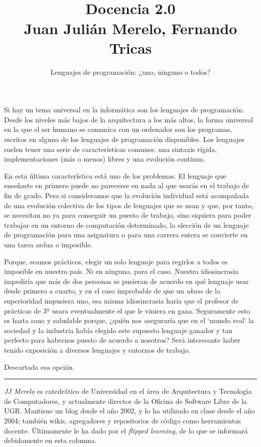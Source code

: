 \documentclass[twoside,10pt]{article}
\title{\ \\ Docencia 2.0\\ \large Juan Juli\'{a}n Merelo, Fernando Tricas}
\author{\LARGE Lenguajes de programación: ¿uno, ninguno o todos?}
\date{}
\newcounter{vol}
\begin{document}
\addtocounter{page}{2}

\maketitle
\vspace*{-5ex}

\begin{multicols}{2}

Si hay un tema universal en la informática son los lenguajes de
programación. Desde los niveles más bajos de la arquitectura a los más
altos, la forma universal en la que el ser humano se comunica con un
ordenador son los programas, escritos en alguno de los lenguajes de
programación disponibles. Los lenguajes suelen tener una serie de
características comunes: una sintaxis rígida, implementaciones (más o
menos) libres y una evolución continua.

En esta última característica está uno de los problemas. El lenguaje
que enseñaste en primero puede no parecerse en nada al que usarás en
el trabajo de fin de grado. Pero si consideramos que la evolución
individual está acompañada de una evolución colectiva de los tipos de
lenguajes que se usan y que, por tanto, se necesitan no ya para
conseguir un puesto de trabajo, sino siquiera para poder trabajar en
un entorno de computación determinado, la elección de un lenguaje de
programación para una asignatura o para una carrera entera se convierte en
una tarea ardua o imposible.

Porque, seamos prácticos, elegir un solo lenguaje para regirlos a
todos es imposible en nuestro país. Ni en ninguno, para el caso.
Nuestra idiosincrasia impediría que más de dos personas se pusieran de
acuerdo en qué lenguaje usar desde primero a cuarto, y en el caso
improbable de que un {\em ukase} de la superioridad impusiera uno, esa
misma idiosincrasia haría que el profesor de prácticas de 3º usara
eventualmente el que le viniera en gana. 
Seguramente esto es hasta sano y saludable porque, ¿quién nos aseguraría
que en el `mundo real' la sociedad y la industria había elegido este
supuesto lenguaje ganador y tan perfecto para habernos puesto de acuerdo a
nosotros? Será interesante haber tenido exposición a diversos lenguajes y
entornos de trabajo.

Descartada esa opción.


\noindent\rule{86mm}{1pt}
\vspace{1ex} {\small{\begin{window} 
\noindent\emph{JJ Merelo} es catedr\'{a}tico de Universidad
en el \'area de Arquitectura y Tecnolog\'{\i}a de Computadores, y
actualmente director de la Oficina de Software Libre de la UGR.
Mantiene un blog desde el a\~no 2002, y lo ha utilizado en clase desde
el a\~no 2004; tambi\'en wikis, agregadores y repositorios de c\'odigo
como herramientas docente. \'{U}ltimamente le ha dado por el \textsl{flipped
learning}, de lo que se informar\'{a} debidamente en esta columna.
\end{window}}}


\end{multicols}
\end{document}
